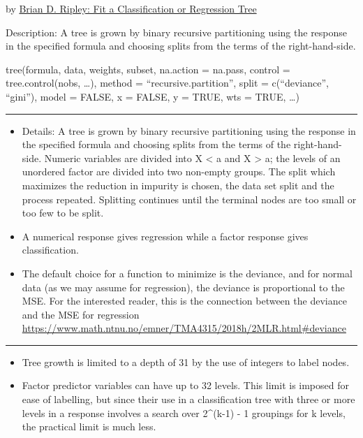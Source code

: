 \documentclass[
  letterpaper,
  DIV=11,
  numbers=noendperiod]{scrartcl}
\providecommand{\tightlist}{%
  \setlength{\itemsep}{0pt}\setlength{\parskip}{0pt}}\usepackage{longtable,booktabs,array}
\begin{document}
by \href{https://cran.r-project.org/web/packages/tree/index.html}{Brian
D. Ripley: Fit a Classification or Regression Tree}

Description: A tree is grown by binary recursive partitioning using the
response in the specified formula and choosing splits from the terms of
the right-hand-side.

tree(formula, data, weights, subset, na.action = na.pass, control =
tree.control(nobs, \ldots), method = ``recursive.partition'', split =
c(``deviance'', ``gini''), model = FALSE, x = FALSE, y = TRUE, wts =
TRUE, \ldots)

\begin{center}\rule{0.5\linewidth}{0.5pt}\end{center}

\begin{itemize}
\tightlist
\item
  Details: A tree is grown by binary recursive partitioning using the
  response in the specified formula and choosing splits from the terms
  of the right-hand-side. Numeric variables are divided into X
  \textless{} a and X \textgreater{} a; the levels of an unordered
  factor are divided into two non-empty groups. The split which
  maximizes the reduction in impurity is chosen, the data set split and
  the process repeated. Splitting continues until the terminal nodes are
  too small or too few to be split.
\item
  A numerical response gives regression while a factor response gives
  classification.
\item
  The default choice for a function to minimize is the deviance, and for
  normal data (as we may assume for regression), the deviance is
  proportional to the MSE. For the interested reader, this is the
  connection between the deviance and the MSE for regression
  \url{https://www.math.ntnu.no/emner/TMA4315/2018h/2MLR.html\#deviance}
\end{itemize}

\begin{center}\rule{0.5\linewidth}{0.5pt}\end{center}

\begin{itemize}
\tightlist
\item
  Tree growth is limited to a depth of 31 by the use of integers to
  label nodes.
\item
  Factor predictor variables can have up to 32 levels. This limit is
  imposed for ease of labelling, but since their use in a classification
  tree with three or more levels in a response involves a search over
  2\^{}(k-1) - 1 groupings for k levels, the practical limit is much
  less.
\end{itemize}
\end{document}

